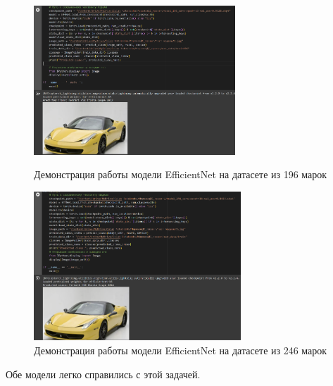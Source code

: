 \documentclass[14pt]{extarticle}
\begin{document}
\begin{figure}[H]
\centering
\begin{minipage}{0.49\textwidth}
  \centering
  \includegraphics[height=5.6cm]{images/12.png}  
  \caption{Демонстрация работы модели \foreignlanguage{english}{EfficientNet} на датасете из 196 марок}
  \label{fig:12}
\end{minipage}
\hfill
\begin{minipage}{0.49\textwidth}
  \centering
  \includegraphics[height=5.6cm]{images/13.png}  
  \caption{Демонстрация работы модели \foreignlanguage{english}{EfficientNet} на датасете из 246 марок}
  \label{fig:13}
\end{minipage}
\end{figure}

\noindent Обе модели легко справились с этой задачей. 
\end{document}
